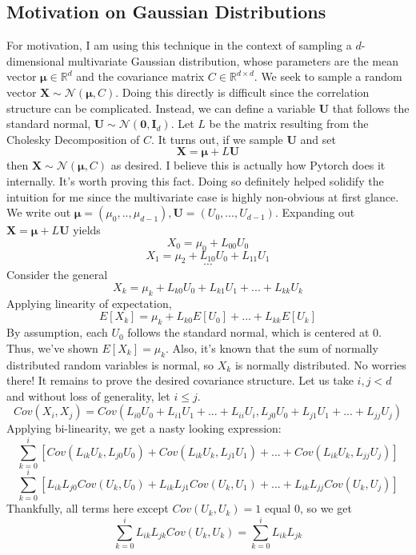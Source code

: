 \documentclass{article}
\begin{document}
\subsection{Motivation on Gaussian Distributions}
For motivation, I am using this technique in the context of sampling a $d$-dimensional multivariate Gaussian distribution, whose parameters are the mean vector $\boldsymbol{\mu} \in \mathbb{R}^d$ and the covariance matrix $C \in \mathbb{R}^{d \times d}$. 
We seek to sample a random vector $\mathbf{X} \sim \mathcal{N}(\boldsymbol{\mu}, C)$. Doing this directly is difficult since the correlation structure can be complicated. 
Instead, we can define a variable $\mathbf{U}$ that follows the standard normal, $\mathbf{U} \sim \mathcal{N}(\boldsymbol{0}, \mathbf{I}_d)$. Let $L$ be the matrix resulting from the Cholesky Decomposition of $C$. It turns out, if we sample $\mathbf{U}$ and set 
$$ \mathbf{X} = \boldsymbol{\mu} + L\mathbf{U}$$
then $\mathbf{X} \sim \mathcal{N}(\boldsymbol{\mu}, C)$ as desired. I believe this is actually how Pytorch does it internally. \bigskip
\newline
It's worth proving this fact. Doing so definitely helped solidify the intuition for me since the multivariate case is highly non-obvious at first glance.  
We write out $\boldsymbol{\mu} = (\mu_0,..,\mu_{d-1}), \mathbf{U} = (U_0,...,U_{d-1})$. 
Expanding out $ \mathbf{X} = \boldsymbol{\mu} + L\mathbf{U}$ yields
$$ X_0 = \mu_0 + L_{00}U_0$$
$$ X_1 = \mu_2 + L_{10}U_0 + L_{11}U_1$$
$$ \cdots $$
Consider the general 
$$ X_k = \mu_k + L_{k0}U_0 + L_{k1}U_1 + ... + L_{kk}U_k$$
Applying linearity of expectation, 
$$ E[X_k] = \mu_k + L_{k0}E[U_0] + ... + L_{kk}E[U_k]$$
By assumption, each $U_0$ follows the standard normal, which is centered at 0. Thus, we've shown $E[X_k] = \mu_k$. Also, it's known that the sum of normally distributed random variables is normal, so $X_k$ is normally distributed. No worries there! \bigskip
\newline
It remains to prove the desired covariance structure. 
Let us take $i,j < d$ and without loss of generality, let $i \leq j$. 
$$ Cov(X_i, X_j) = Cov(L_{i0}U_0 + L_{i1}U_1 + ... + L_{ii}U_i, L_{j0}U_0 + L_{j1}U_1 + ... + L_{jj}U_j)$$
Applying bi-linearity, we get a nasty looking expression: 
$$ \sum_{k=0}^{i} [Cov(L_{ik}U_k, L_{j0}U_0) + Cov(L_{ik}U_k, L_{j1}U_1) + ... + Cov(L_{ik}U_k, L_{jj}U_j)]$$
$$ \sum_{k=0}^{i} [L_{ik}L_{j0}Cov(U_k, U_0) + L_{ik}L_{j1}Cov(U_k, U_1) + ... + L_{ik}L_{jj}Cov(U_k, U_j)]$$
Thankfully, all terms here except $Cov(U_k, U_k) = 1$ equal 0, so we get 
$$ \sum_{k=0}^{i} L_{ik}L_{jk}Cov(U_k, U_k) = \sum_{k=0}^{i}L_{ik}L_{jk}$$
\end{document}
